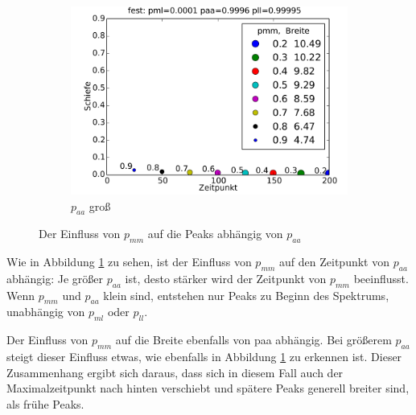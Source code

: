 \begin{figure}[H]
\begin{subfigure}{0.6\textwidth}
\includegraphics[width=\textwidth]{bilder/pmm/3fest_p_00001_09996_099995}
\caption{$p_{aa}$ groß}
\end{subfigure}
\caption{Der Einfluss von $p_{mm}$ auf die Peaks abhängig von $p_{aa}$}
\label{einfluss_pmm_1}
\end{figure}


Wie in Abbildung \ref{einfluss_pmm_1} zu sehen, ist der Einfluss von $p_{mm}$ auf den Zeitpunkt von $p_{aa}$ abhängig: Je größer $p_{aa}$ ist, desto stärker wird der Zeitpunkt von $p_{mm}$ beeinflusst. Wenn $p_{mm}$ und $p_{aa}$ klein sind, entstehen nur Peaks zu Beginn des Spektrums, unabhängig von $p_{ml}$ oder $p_{ll}$.

Der Einfluss von $p_{mm}$ auf die Breite ebenfalls von paa abhängig. Bei größerem $p_{aa}$ steigt dieser Einfluss etwas, wie ebenfalls in Abbildung \ref{einfluss_pmm_1} zu erkennen ist. Dieser Zusammenhang ergibt sich daraus, dass sich in diesem Fall auch der Maximalzeitpunkt nach hinten verschiebt und spätere Peaks generell breiter sind, als frühe Peaks.


